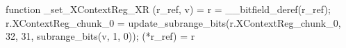 function _set_XContextReg_XR (r_ref, v) = {
    r = __bitfield_deref(r_ref);
    r.XContextReg_chunk_0 = update_subrange_bits(r.XContextReg_chunk_0, 32, 31, subrange_bits(v, 1, 0));
    (*r_ref) = r
}
